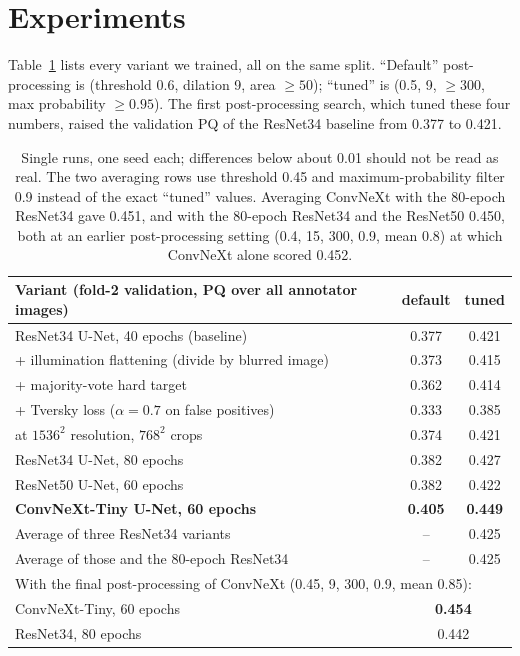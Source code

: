 \documentclass[10pt]{article}
\begin{document}
\section{Experiments}
Table~\ref{tab:exp} lists every variant we trained, all on the same split. ``Default'' post-processing is
(threshold 0.6, dilation 9, area $\ge50$); ``tuned'' is (0.5, 9, $\ge300$, max probability $\ge0.95$). The first
post-processing search, which tuned these four numbers, raised the validation PQ of the ResNet34 baseline from 0.377
to 0.421.

\begin{table}[h]
\centering\small
\begin{tabular}{lcc}
\hline
Variant (fold-2 validation, PQ over all annotator images) & default & tuned\\
\hline
ResNet34 U-Net, 40 epochs (baseline) & 0.377 & 0.421\\
\quad + illumination flattening (divide by blurred image) & 0.373 & 0.415\\
\quad + majority-vote hard target & 0.362 & 0.414\\
\quad + Tversky loss ($\alpha{=}0.7$ on false positives) & 0.333 & 0.385\\
\quad at $1536^2$ resolution, $768^2$ crops & 0.374 & 0.421\\
ResNet34 U-Net, 80 epochs & 0.382 & 0.427\\
ResNet50 U-Net, 60 epochs & 0.382 & 0.422\\
\textbf{ConvNeXt-Tiny U-Net, 60 epochs} & \textbf{0.405} & \textbf{0.449}\\
Average of three ResNet34 variants & -- & 0.425\\
Average of those and the 80-epoch ResNet34 & -- & 0.425\\
\hline
\multicolumn{3}{l}{With the final post-processing of ConvNeXt (0.45, 9, 300, 0.9, mean 0.85):}\\
ConvNeXt-Tiny, 60 epochs & \multicolumn{2}{c}{\textbf{0.454}}\\
ResNet34, 80 epochs & \multicolumn{2}{c}{0.442}\\
\hline
\end{tabular}
\caption{Single runs, one seed each; differences below about 0.01 should not be read as real. The two averaging rows use
threshold 0.45 and maximum-probability filter 0.9 instead of the exact ``tuned'' values. Averaging ConvNeXt with the
80-epoch ResNet34 gave 0.451, and with the 80-epoch ResNet34 and the ResNet50 0.450, both at an earlier post-processing
setting (0.4, 15, 300, 0.9, mean 0.8) at which ConvNeXt alone scored 0.452.}
\label{tab:exp}
\end{table}
\end{document}
